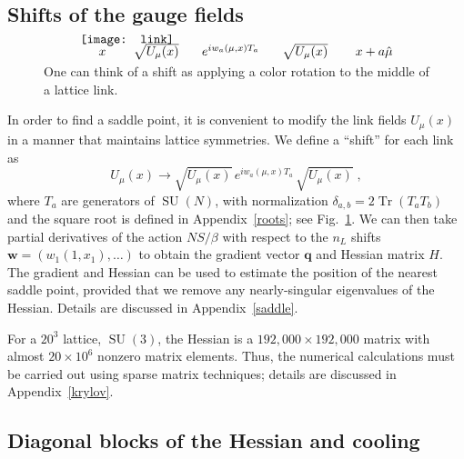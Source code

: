 \documentclass[preprint,aps,prd]{revtex4-2}
\newcommand{\be}{\begin{equation}}
\newcommand{\eq}{\end{equation}}
\DeclareMathOperator{\SU}{SU}
\DeclareMathOperator{\Tr}{Tr}
\begin{document}
\subsection{Shifts of the gauge fields}
\label{shiftSection}

\begin{figure}
  \[
  \begin{array}{l}
    \mbox{} \hspace{0.2in} x \hspace{0.3in} \sqrt{U_\mu(x)}
    \hspace{0.25in} e^{i w_{a}(\mu, x) T_a}
    \hspace{0.25in} \sqrt{U_\mu(x)} \hspace{0.3in} x+a\hat{\mu} \\[-0.3in]
  \texttt{[image: link]}
  \end{array}
  \]
  \caption{One can think of a shift as applying a color rotation
    to the middle of a lattice link. \label{shift}}
\end{figure}

In order to find a saddle point, it is convenient to modify
the link fields $U_\mu(x)$ in a manner that maintains lattice symmetries.
We define a ``shift'' for each link as
\be
  U_\mu(x) \to \sqrt{U_\mu(x)}\, e^{i w_{a}(\mu, x) T_a}\, \sqrt{U_\mu(x)} \; ,
    \label{shifts}
\eq
where $T_a$ are generators of $\SU(N)$, with normalization
$\delta_{a,b} = 2 \Tr(T_a T_b)$ and the square root is defined
in Appendix~\ref{roots}; see Fig.~\ref{shift}.
We can then take partial derivatives of the action $N S/\beta$ with
respect to the $n_L$ shifts $\mathbf{w} = \left(w_1(1, x_1), \ldots\right)$
to obtain the gradient vector $\mathbf{q}$ and Hessian matrix
$H$.  The gradient and Hessian can be used to estimate the
position of the nearest saddle point, provided that we remove any
nearly-singular eigenvalues of the Hessian.  Details are discussed in
Appendix~\ref{saddle}.

For a $20^3$ lattice, $\SU(3)$, the Hessian is a
$192,000 \times 192,000$ matrix with almost $20\times 10^6$
nonzero matrix elements. Thus, the numerical calculations
must be carried out using sparse matrix techniques;
details are discussed in Appendix~\ref{krylov}.


\subsection{Diagonal blocks of the Hessian and cooling}
\label{shiftSection2}
\end{document}
